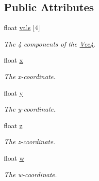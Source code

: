 \subsection*{Public Attributes}
\begin{DoxyCompactItemize}
\item 
float \hyperlink{classgfxmath_1_1_vec4_aa668d284af0138ed1d09663fb0bd3d6f}{vals} \mbox{[}4\mbox{]}
\begin{DoxyCompactList}\small\item\em The 4 components of the \hyperlink{classgfxmath_1_1_vec4}{Vec4}. \end{DoxyCompactList}\item 
float \hyperlink{classgfxmath_1_1_vec4_a273598aff75406f0e7a47121b8b06037}{x}
\begin{DoxyCompactList}\small\item\em The x-\/coordinate. \end{DoxyCompactList}\item 
float \hyperlink{classgfxmath_1_1_vec4_a95e0ca27d66d7e0223606c20d326b595}{y}
\begin{DoxyCompactList}\small\item\em The y-\/coordinate. \end{DoxyCompactList}\item 
float \hyperlink{classgfxmath_1_1_vec4_acd626b757468a5ea39f98812a36c4419}{z}
\begin{DoxyCompactList}\small\item\em The z-\/coordinate. \end{DoxyCompactList}\item 
float \hyperlink{classgfxmath_1_1_vec4_adf2769a47b464dfee8d04e191f21701e}{w}
\begin{DoxyCompactList}\small\item\em The w-\/coordinate. \end{DoxyCompactList}\end{DoxyCompactItemize}

